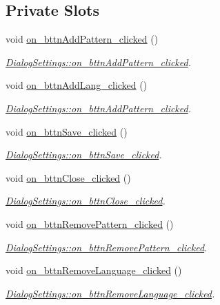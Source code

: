 \subsection*{Private Slots}
\begin{DoxyCompactItemize}
\item 
void \hyperlink{class_dialog_settings_a787f686519f7877b35a330e584965c5c}{on\+\_\+bttn\+Add\+Pattern\+\_\+clicked} ()
\begin{DoxyCompactList}\small\item\em \hyperlink{class_dialog_settings_a787f686519f7877b35a330e584965c5c}{Dialog\+Settings\+::on\+\_\+bttn\+Add\+Pattern\+\_\+clicked}. \end{DoxyCompactList}\item 
void \hyperlink{class_dialog_settings_a90c6372109b546601f37e694552158a4}{on\+\_\+bttn\+Add\+Lang\+\_\+clicked} ()
\begin{DoxyCompactList}\small\item\em \hyperlink{class_dialog_settings_a787f686519f7877b35a330e584965c5c}{Dialog\+Settings\+::on\+\_\+bttn\+Add\+Pattern\+\_\+clicked}. \end{DoxyCompactList}\item 
void \hyperlink{class_dialog_settings_a04ff2f5547ff8e6b4725664153ff227f}{on\+\_\+bttn\+Save\+\_\+clicked} ()
\begin{DoxyCompactList}\small\item\em \hyperlink{class_dialog_settings_a04ff2f5547ff8e6b4725664153ff227f}{Dialog\+Settings\+::on\+\_\+bttn\+Save\+\_\+clicked}. \end{DoxyCompactList}\item 
void \hyperlink{class_dialog_settings_af5046dffc64be390d766fa3bcd894a42}{on\+\_\+bttn\+Close\+\_\+clicked} ()
\begin{DoxyCompactList}\small\item\em \hyperlink{class_dialog_settings_af5046dffc64be390d766fa3bcd894a42}{Dialog\+Settings\+::on\+\_\+bttn\+Close\+\_\+clicked}. \end{DoxyCompactList}\item 
void \hyperlink{class_dialog_settings_a32f59e49086e1c86e4a11eb883cc81dd}{on\+\_\+bttn\+Remove\+Pattern\+\_\+clicked} ()
\begin{DoxyCompactList}\small\item\em \hyperlink{class_dialog_settings_a32f59e49086e1c86e4a11eb883cc81dd}{Dialog\+Settings\+::on\+\_\+bttn\+Remove\+Pattern\+\_\+clicked}. \end{DoxyCompactList}\item 
void \hyperlink{class_dialog_settings_a37b337f965d8794d13235ff79ea54cce}{on\+\_\+bttn\+Remove\+Language\+\_\+clicked} ()
\begin{DoxyCompactList}\small\item\em \hyperlink{class_dialog_settings_a37b337f965d8794d13235ff79ea54cce}{Dialog\+Settings\+::on\+\_\+bttn\+Remove\+Language\+\_\+clicked}. \end{DoxyCompactList}\end{DoxyCompactItemize}
